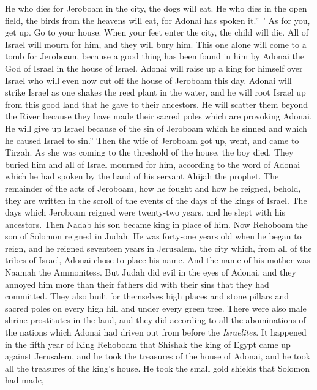 \begin{biblechapter}
\verse He who dies for Jeroboam in the city, the dogs will eat. He who dies in the open field, the birds from the heavens will eat, for Adonai has spoken it.” ’
\verse As for you, get up. Go to your house. When your feet enter the city, the child will die.
\verse All of Israel will mourn for him, and they will bury him. This one alone will come to a tomb for Jeroboam, because a good thing has been found in him by Adonai the God of Israel in the house of Israel.
\verse Adonai will raise up a king for himself over Israel who will even now cut off the house of Jeroboam this day.
\verse Adonai will strike Israel as one shakes the reed plant in the water, and he will root Israel up from this good land that he gave to their ancestors. He will scatter them beyond the River because they have made their sacred poles which are provoking Adonai.
\verse He will give up Israel because of the sin of Jeroboam which he sinned and which he caused Israel to sin.”
\verse Then the wife of Jeroboam got up, went, and came to Tirzah. As she was coming to the threshold of the house, the boy died.
\verse They buried him and all of Israel mourned for him, according to the word of Adonai which he had spoken by the hand of his servant Ahijah the prophet.
\verse The remainder of the acts of Jeroboam, how he fought and how he reigned, behold, they are written in the scroll of the events of the days of the kings of Israel.
\verse The days which Jeroboam reigned were twenty-two years, and he slept with his ancestors. Then Nadab his son became king in place of him.
 Now Rehoboam the son of Solomon reigned in Judah. He was forty-one years old when he began to reign, and he reigned seventeen years in Jerusalem, the city which, from all of the tribes of Israel, Adonai chose to place his name. And the name of his mother was Naamah the Ammonitess.
\verse But Judah did evil in the eyes of Adonai, and they annoyed him more than their fathers did with their sins that they had committed.
\verse They also built for themselves high places and stone pillars and sacred poles on every high hill and under every green tree.
\verse There were also male shrine prostitutes in the land, and they did according to all the abominations of the nations which Adonai had driven out from before the \textit{Israelites}.
 It happened in the fifth year of King Rehoboam that Shishak the king of Egypt came up against Jerusalem,
\verse and he took the treasures of the house of Adonai, and he took all the treasures of the king’s house. He took the small gold shields that Solomon had made,

\end{biblechapter}
